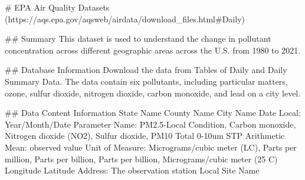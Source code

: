 # EPA Air Quality Datasets (https://aqs.epa.gov/aqsweb/airdata/download_files.html#Daily)

## Summary
This dataset is used to understand the change in pollutant concentration across different geographic areas across the U.S. from 1980 to 2021. 

## Database Information
Download the data from Tables of Daily and Daily Summary Data. 
The data contain six pollutants, including particular matters, ozone, sulfur dioxide, nitrogen dioxide, carbon monoxide, and lead on a city level. 

## Data Content Information
State Name
County Name
City Name
Date Local: Year/Month/Date
Parameter Name: PM2.5-Local Condition, Carbon monoxide, Nitrogen dioxide (NO2), Sulfur dioxide, PM10 Total 0-10um STP 
Arithmetic Mean: observed value
Unit of Measure: Micrograms/cubic meter (LC), Parts per million, Parts per billion, Parts per billion, Micrograms/cubic meter (25 C)
Longitude 
Latitude
Address: The observation station 
Local Site Name
